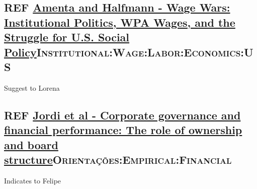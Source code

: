 \documentclass[11pt]{article}
\begin{document}
\subsection*{{\bfseries\sffamily REF} \href{https://www.jstor.org/stable/2657380}{Amenta and Halfmann - Wage Wars: Institutional Politics, WPA Wages, and the Struggle for U.S. Social Policy}\hfill{}\textsc{Institutional:Wage:Labor:Economics:US}}
\label{sec:orga1f3c64}
Suggest to Lorena

\subsection*{{\bfseries\sffamily REF} \href{https://doi.org/10.1016/j.jbusres.2018.01.060}{Jordi et al - Corporate governance and financial performance: The role of ownership and board structure}\hfill{}\textsc{Orientações:Empirical:Financial}}
\label{sec:orgf2550f9}
Indicates to Felipe
\end{document}
